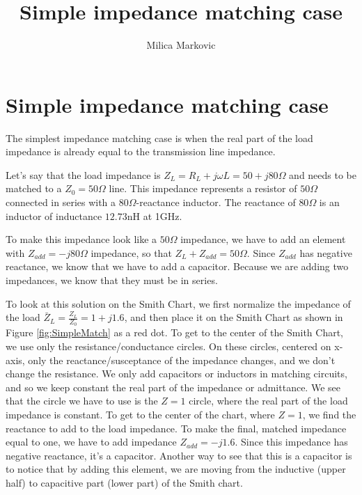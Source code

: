 \documentclass{ximera}
\title{Simple impedance matching case}
\author{Milica Markovic}
\begin{document}
  
\begin{abstract}  

\end{abstract}  
\maketitle    


\section{Simple impedance matching case}

The simplest impedance matching case is when the real part of the load impedance is already equal to the transmission line impedance. 

Let's say that the load impedance is $Z_L=R_L+j \omega L =50+j80 \Omega$ and needs to be matched to a $Z_0=50\Omega$ line. This impedance represents a resistor of $50\Omega$ connected in series with a $80 \Omega$-reactance inductor. The reactance of $80 \Omega$ is an inductor of inductance $12.73$nH at 1GHz.  

To make this impedance look like a $50 \Omega$ impedance, we have to add an element   with $Z_{add}=-j80 \Omega $ impedance, so that $Z_L+Z_{add}=50 \Omega$. Since $Z_{add}$ has negative reactance, we know that we have to add a capacitor. Because we are adding two impedances, we know that they must be in series.

To look at this solution on the Smith Chart, we first normalize the impedance of the load $\bar{Z}_L=\frac{Z_L}{Z_0}=1+j1.6$, and then place it on the Smith Chart as shown in Figure \ref{fig:SimpleMatch} as a red dot. To get to the center of the Smith Chart, we use only the resistance/conductance circles. On these circles, centered on x-axis, only the reactance/susceptance of the impedance changes, and we don't change the resistance.  We only add capacitors or inductors in matching circuits, and so we keep constant the real part of the impedance or admittance. We see that the circle we have to use is the $Z=1$ circle, where the real part of the load impedance is constant.  To get to the center of the chart, where $Z=1$, we find the reactance  to add to the load impedance. To make the final, matched impedance equal to one, we have to add impedance $Z_{add}=-j1.6$. Since this impedance has negative reactance, it's a capacitor. Another way to see that this is a capacitor is to notice that by adding this element, we are moving from the inductive (upper half) to capacitive part (lower part) of the Smith chart.
\end{document}
